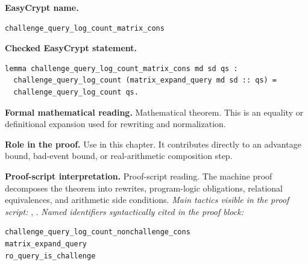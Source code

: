\begin{formaltheorem}
\noindent\textbf{EasyCrypt name.}
\begin{lstlisting}[language=EasyCrypt,basicstyle=\ttfamily\scriptsize]
challenge_query_log_count_matrix_cons
\end{lstlisting}
\noindent\textbf{Checked EasyCrypt statement.}
\begin{lstlisting}[language=EasyCrypt,basicstyle=\ttfamily\scriptsize]
lemma challenge_query_log_count_matrix_cons md sd qs :
  challenge_query_log_count (matrix_expand_query md sd :: qs) =
  challenge_query_log_count qs.
\end{lstlisting}
\noindent\textbf{Formal mathematical reading.}
Mathematical theorem. This is an equality or definitional expansion used for rewriting and normalization.

\noindent\textbf{Role in the proof.}
Use in this chapter. It contributes directly to an advantage bound, bad-event bound, or real-arithmetic composition step.

\noindent\textbf{Proof-script interpretation.}
Proof-script reading. The machine proof decomposes the theorem into rewrites, program-logic obligations, relational equivalences, and arithmetic side conditions.
\emph{Main tactics visible in the proof script:} , .
\emph{Named identifiers syntactically cited in the proof block:}
\begin{lstlisting}[language=EasyCrypt,basicstyle=\ttfamily\scriptsize]
challenge_query_log_count_nonchallenge_cons
matrix_expand_query
ro_query_is_challenge
\end{lstlisting}

\end{formaltheorem}


